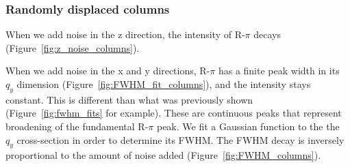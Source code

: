 \documentclass{article}
\begin{document}
  \subsubsection{Randomly displaced columns}

  When we add noise in the z direction, the intensity of R-$\pi$ decays
  (Figure~\ref{fig:z_noise_columns}).

  When we add noise in the x and y directions, R-$\pi$ has a finite peak width
  in its $q_y$ dimension (Figure~\ref{fig:FWHM_fit_columns}), and the intensity
  stays constant. This is different than what was previously shown
  (Figure~\ref{fig:fwhm_fits} for example). These are continuous peaks that
  represent broadening of the fundamental R-$\pi$ peak. We fit a Gaussian
  function to the the $q_y$ cross-section in order to determine its FWHM. The
  FWHM decay is inversely proportional to the amount of noise added
  (Figure~\ref{fig:FWHM_columns}). 
\end{document}
